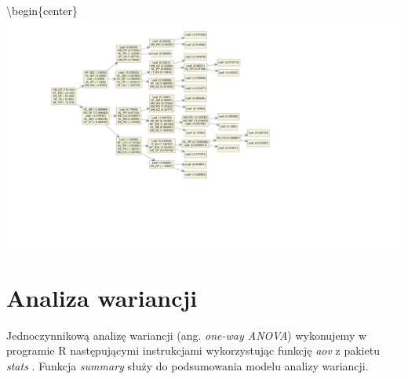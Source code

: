 \documentclass{amuthesis}
\begin{document}
\textbackslash begin\{center\}\includegraphics[width=1\linewidth]{figures/unnamed-chunk-30-1}

\hypertarget{aw_ad}{%
\section{Analiza wariancji}\label{aw_ad}}

Jednoczynnikową analizę wariancji (ang. \emph{one-way ANOVA}) wykonujemy w programie R następującymi instrukcjami wykorzystując funkcję \emph{aov} z pakietu \emph{stats} \autocite{R-stats}. Funkcja \emph{summary} służy do podsumowania modelu analizy wariancji.

\begin{Shaded}
\begin{Highlighting}[]
\OtherTok{\textless{}{-}}\SpecialCharTok{::}\SpecialCharTok{$}\SpecialCharTok{\textasciitilde{}}\SpecialCharTok{$}
\CommentTok{\#\textgreater{} {-}{-}{-}}
\end{Highlighting}
\end{Shaded}
\end{document}
